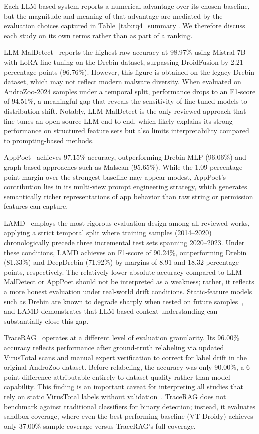Each LLM-based system reports a numerical advantage over its chosen baseline, but the magnitude and meaning of that advantage are mediated by the evaluation choices captured in Table~\ref{tab:rq4_summary}. We therefore discuss each study on its own terms rather than as part of a ranking.

LLM-MalDetect~\cite{Feng2025-ry} reports the highest raw accuracy at 98.97\% using Mistral 7B with LoRA fine-tuning on the Drebin dataset, surpassing DroidFusion by 2.21 percentage points (96.76\%). However, this figure is obtained on the legacy Drebin dataset, which may not reflect modern malware diversity. When evaluated on AndroZoo-2024 samples under a temporal split, performance drops to an F1-score of 94.51\%, a meaningful gap that reveals the sensitivity of fine-tuned models to distribution shift. Notably, LLM-MalDetect is the only reviewed approach that fine-tunes an open-source LLM end-to-end, which likely explains its strong performance on structured feature sets but also limits interpretability compared to prompting-based methods.

AppPoet~\cite{Zhao2024-dw} achieves 97.15\% accuracy, outperforming Drebin-MLP (96.06\%) and graph-based approaches such as Malscan (95.65\%). While the 1.09 percentage point margin over the strongest baseline may appear modest, AppPoet's contribution lies in its multi-view prompt engineering strategy, which generates semantically richer representations of app behavior than raw string or permission features can capture.

LAMD~\cite{Qian2025-ua} employs the most rigorous evaluation design among all reviewed works, applying a strict temporal split where training samples (2014--2020) chronologically precede three incremental test sets spanning 2020--2023. Under these conditions, LAMD achieves an F1-score of 90.24\%, outperforming Drebin (81.33\%) and DeepDrebin (71.92\%) by margins of 8.91 and 18.32 percentage points, respectively. The relatively lower absolute accuracy compared to LLM-MalDetect or AppPoet should not be interpreted as a weakness; rather, it reflects a more honest evaluation under real-world drift conditions. Static-feature models such as Drebin are known to degrade sharply when tested on future samples~\cite{barbero2022transcending, pendlebury2019tesseract}, and LAMD demonstrates that LLM-based context understanding can substantially close this gap.

TraceRAG~\cite{Zhang2025-ot} operates at a different level of evaluation granularity. Its 96.00\% accuracy reflects performance after ground-truth relabeling via updated VirusTotal scans and manual expert verification to correct for label drift in the original AndroZoo dataset. Before relabeling, the accuracy was only 90.00\%, a 6-point difference attributable entirely to dataset quality rather than model capability. This finding is an important caveat for interpreting all studies that rely on static VirusTotal labels without validation~\cite{zhu2020benchmarking}. TraceRAG does not benchmark against traditional classifiers for binary detection; instead, it evaluates sandbox coverage, where even the best-performing baseline (VT Droidy) achieves only 37.00\% sample coverage versus TraceRAG's full coverage.

